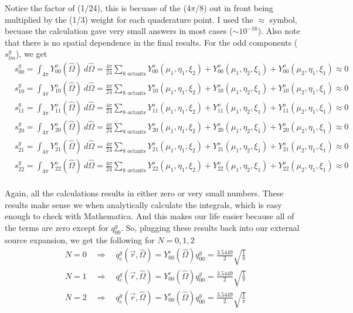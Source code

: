 \documentclass[10pt]{article}
\begin{document}
Notice the factor of (1/24), this is becuase of the (4$\pi$/8) out in front being multiplied by the (1/3) weight for each quaderature point. I used the $\approx$ symbol, becuase the calculation gave very small answers in most cases ($\sim 10^{-16}$). Also note that there is no spatial dependence in the final results. For the odd components ($s_{lm}^g$), we get
%
\begin{align*}
  &s_{00}^g = \int_{4\pi}Y_{00}^o(\hat{\Omega})\:d\hat{\Omega} = \frac{4\pi}{24}\sum_{\textrm{8 octants}}Y_{00}^o(\mu_1,\eta_1,\xi_2) + Y_{00}^o(\mu_1,\eta_2,\xi_1) + Y_{00}^o(\mu_2,\eta_1,\xi_1) \approx 0 \\
  &s_{10}^g =\int_{4\pi}Y_{10}^o(\hat{\Omega})\:d\hat{\Omega} = \frac{4\pi}{24}\sum_{\textrm{8 octants}}Y_{10}^o(\mu_1,\eta_1,\xi_2) + Y_{10}^o(\mu_1,\eta_2,\xi_1) + Y_{10}^o(\mu_2,\eta_1,\xi_1) \approx 0 \\
  &s_{11}^g =\int_{4\pi}Y_{11}^o(\hat{\Omega})\:d\hat{\Omega} = \frac{4\pi}{24}\sum_{\textrm{8 octants}}Y_{11}^o(\mu_1,\eta_1,\xi_2) + Y_{11}^o(\mu_1,\eta_2,\xi_1) + Y_{11}^o(\mu_2,\eta_1,\xi_1) \approx 0 \\
  &s_{20}^g =\int_{4\pi}Y_{20}^o(\hat{\Omega})\:d\hat{\Omega} = \frac{4\pi}{24}\sum_{\textrm{8 octants}}Y_{20}^o(\mu_1,\eta_1,\xi_2) + Y_{20}^o(\mu_1,\eta_2,\xi_1) + Y_{20}^o(\mu_2,\eta_1,\xi_1) \approx 0 \\
  &s_{21}^g =\int_{4\pi}Y_{21}^o(\hat{\Omega})\:d\hat{\Omega} = \frac{4\pi}{24}\sum_{\textrm{8 octants}}Y_{21}^o(\mu_1,\eta_1,\xi_2) + Y_{21}^o(\mu_1,\eta_2,\xi_1) + Y_{21}^o(\mu_2,\eta_1,\xi_1) \approx 0 \\
  &s_{22}^g =\int_{4\pi}Y_{22}^o(\hat{\Omega})\:d\hat{\Omega} = \frac{4\pi}{24}\sum_{\textrm{8 octants}}Y_{22}^o(\mu_1,\eta_1,\xi_2) + Y_{22}^o(\mu_1,\eta_2,\xi_1) + Y_{22}^o(\mu_2,\eta_1,\xi_1) \approx 0 \\
\end{align*}

Again, all the calculations results in either zero or very small numbers. These results make sense we when analytically calculate the integrals, which is easy enough to check with Mathematica. And this makes our life easier because all of the terms are zero except for $q_{00}^g$. So, plugging these results back into our external source expansion, we get the following for $N=0,1,2$
%
\begin{align*}
    &N = 0 \quad \Rightarrow \quad q_e^g(\vec{r},\hat{\Omega}) = Y_{00}^e(\hat{\Omega}) q_{00}^g = \frac{3.5449}{2} \sqrt{\frac{1}{\pi}}\\
    &N = 1 \quad \Rightarrow \quad q_e^g(\vec{r},\hat{\Omega}) = Y_{00}^e(\hat{\Omega}) q_{00}^g = \frac{3.5449}{2} \sqrt{\frac{1}{\pi}}\\
    &N = 2 \quad \Rightarrow \quad q_e^g(\vec{r},\hat{\Omega}) = Y_{00}^e(\hat{\Omega}) q_{00}^g = \frac{3.5449}{2} \sqrt{\frac{1}{\pi}}
\end{align*}
\end{document}
